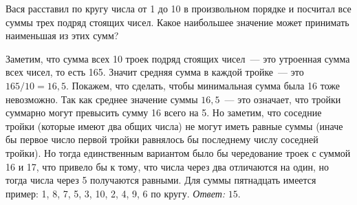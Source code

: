 Вася расставил по кругу числа от 1 до 10 в произвольном порядке и посчитал все
суммы трех подряд стоящих чисел.
Какое наибольшее значение может принимать наименьшая из этих сумм?

\solution
Заметим, что сумма всех 10 троек подряд стоящих чисел~--- это утроенная сумма
всех чисел, то есть 165.
Значит средняя сумма в каждой тройке~--- это $165 / 10 = 16{,}5$.
Покажем, что сделать, чтобы минимальная сумма была 16 тоже невозможно.
Так как среднее значение суммы $16{,}5$~--- это означает, что тройки суммарно
могут превысить сумму 16 всего на 5.
Но заметим, что соседние тройки (которые имеют два общих числа) не могут иметь
равные суммы (иначе бы первое число первой тройки равнялось бы последнему
числу соседней тройки).
Но тогда единственным вариантом было бы чередование троек с суммой 16 и 17,
что привело бы к тому, что числа через два отличаются на один, но тогда числа
через 5 получаются равными.
Для суммы пятнадцать имеется пример: 1, 8, 7, 5, 3, 10, 2, 4, 9, 6 по кругу.
\emph{Ответ:} $15$.

